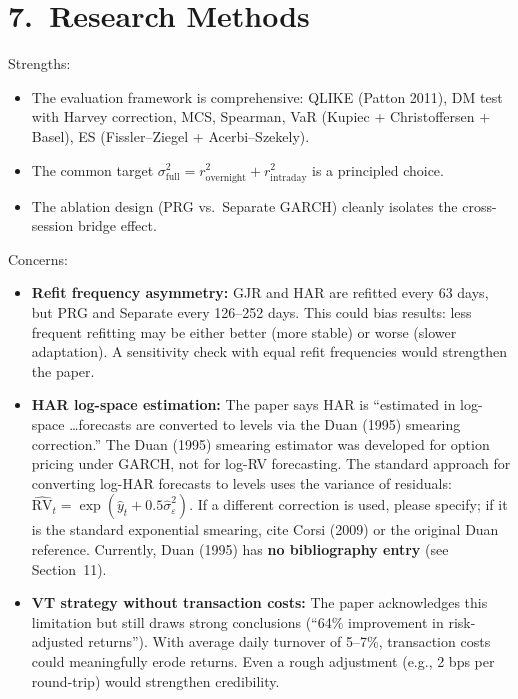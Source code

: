 \documentclass[12pt,a4paper]{article}
\begin{document}
\section*{7.\ Research Methods}

\textcolor{okgreen}{Strengths:}
\begin{itemize}[nosep]
\item The evaluation framework is comprehensive: QLIKE (Patton 2011), DM test with Harvey correction, MCS, Spearman, VaR (Kupiec + Christoffersen + Basel), ES (Fissler--Ziegel + Acerbi--Szekely).
\item The common target $\sigma^2_{\text{full}} = r^2_{\text{overnight}} + r^2_{\text{intraday}}$ is a principled choice.
\item The ablation design (PRG vs.\ Separate GARCH) cleanly isolates the cross-session bridge effect.
\end{itemize}

\textcolor{warncolor}{Concerns:}
\begin{itemize}[nosep]
\item \textbf{Refit frequency asymmetry:} GJR and HAR are refitted every 63 days, but PRG and Separate every 126--252 days. This could bias results: less frequent refitting may be either better (more stable) or worse (slower adaptation). A sensitivity check with equal refit frequencies would strengthen the paper.
\item \textbf{HAR log-space estimation:} The paper says HAR is ``estimated in log-space \ldots forecasts are converted to levels via the Duan (1995) smearing correction.'' The Duan (1995) smearing estimator was developed for option pricing under GARCH, not for log-RV forecasting. The standard approach for converting log-HAR forecasts to levels uses the variance of residuals: $\hat{\text{RV}}_t = \exp(\hat{y}_t + 0.5\hat{\sigma}^2_\varepsilon)$. If a different correction is used, please specify; if it is the standard exponential smearing, cite Corsi (2009) or the original Duan reference. Currently, Duan (1995) has \textbf{no bibliography entry} (see Section~11).
\item \textbf{VT strategy without transaction costs:} The paper acknowledges this limitation but still draws strong conclusions (``64\% improvement in risk-adjusted returns''). With average daily turnover of 5--7\%, transaction costs could meaningfully erode returns. Even a rough adjustment (e.g., 2 bps per round-trip) would strengthen credibility.
\end{itemize}
\end{document}

